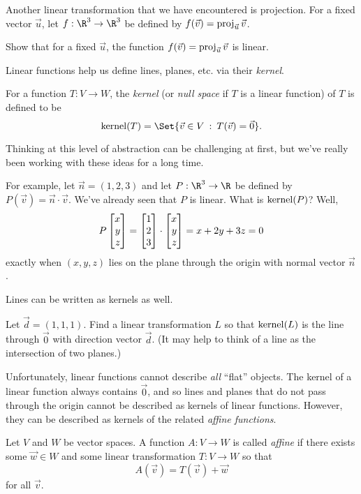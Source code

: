 Another linear transformation that we have encountered is projection.
For a fixed vector $\vec u$, let $f:\R^3\to\R^3$ be defined by 
$f(\vec v) = \operatorname{proj}_{\vec u} \vec v$.

\begin{exercise}
	Show that for a fixed $\vec u$, the function 
	$f(\vec v) = \operatorname{proj}_{\vec u} \vec v$ is linear.
\end{exercise}

Linear functions help us define lines, planes, etc. via their \emph{kernel}.

\begin{definition}[Kernel]
	For a function $T:V\to W$, the \emph{kernel} (or \emph{null space}
	if $T$ is a linear function)
	of $T$ is defined to be 
	\[
		\Ker(T) = \Set{\vec v\in V\given T(\vec v) = \vec 0}.
	\]
\end{definition}

Thinking at this level of abstraction can be challenging at first,
but we've really been working with these ideas for a long time.

For example, let $\vec n = (1,2,3)$ and let $P:\R^3\to\R$ be defined by
$P(\vec v) = \vec n\cdot \vec v$.  We've already seen that $P$ is linear.
What is $\operatorname{kernel}(P)$?  Well,
\[
	P\mat{x\\y\\z} = \mat{1\\2\\3}\cdot \mat{x\\y\\z} = 
	x+2y+3z=0
\]
exactly when $(x,y,z)$ lies on the plane through the origin with normal vector $\vec n$.

Lines can be written as kernels as well.

\begin{exercise}
	Let $\vec d=(1,1,1)$.  Find a linear transformation $L$ so that
	$\operatorname{kernel}(L)$ is the line through $\vec 0$ with direction vector $\vec d$.
	(It may help to think of a line as the intersection of two planes.)
\end{exercise}

Unfortunately, linear functions cannot describe \emph{all} ``flat''
objects.  The kernel of a linear function always contains $\vec 0$, and
so lines and planes that do not pass through the origin cannot be described
as kernels of linear functions.  However, they can be described as kernels
of the related \emph{affine functions}.

\begin{definition}
	Let $V$ and $W$ be vector spaces.  A function $A:V\to W$ is called
	\emph{affine} if there exists some $\vec w\in W$ and some linear transformation
	$T:V\to W$ so that
	\[
		A(\vec v) = T(\vec v) + \vec w
	\]
	for all $\vec v$.
\end{definition}

